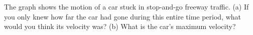   The graph shows the motion of a car stuck in stop-and-go
freeway traffic.  (a) If you only knew how far the car had
gone during this entire time period, what would you think
its velocity was?  (b) What is the car's maximum velocity? \answercheck
